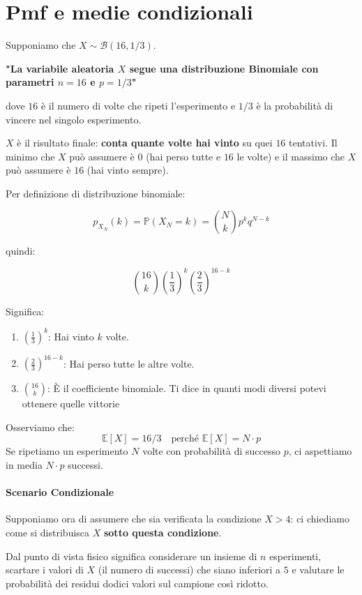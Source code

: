 \section{Pmf e medie condizionali}

Supponiamo che $X \sim \mathcal{B}(16, 1/3)$.

\textbf{"La variabile aleatoria $X$ segue una distribuzione Binomiale con parametri $n= 16$ e $p=1/3$"}

dove $16$ è il numero di volte che ripeti l'esperimento e $1/3$ è la probabilità di vincere nel singolo esperimento.

$X$ è il risultato finale: \textbf{conta quante volte hai vinto} su quei $16$ tentativi. Il minimo che $X$ può assumere è $0$ (hai perso tutte e $16$ le volte) e il massimo che $X$ può assumere è $16$ (hai vinto sempre).

Per definizione di distribuzione binomiale:

\begin{equation}
\boxed{p_{X_N}(k) = \mathbb{P}(X_N = k) = \binom{N}{k} p^k q^{N-k}}
\end{equation}

quindi:

\[
\binom{16}{k} \left(\frac{1}{3}\right)^k \left(\frac{2}{3}\right)^{16-k}
\]

Significa:
\begin{enumerate}
    \item $\left(\frac{1}{3}\right)^k$: Hai vinto $k$ volte.
    \item $\left(\frac{2}{3}\right)^{16-k}$: Hai perso tutte le altre volte.
    \item $\binom{16}{k}$: È il coefficiente binomiale. Ti dice in quanti modi diversi potevi ottenere quelle vittorie 
\end{enumerate}

Osserviamo che:
\[ \mathbb{E}[X] = 16/3 \quad \text{perché } \mathbb{E}[X] = N \cdot p \]
Se ripetiamo un esperimento $N$ volte con probabilità di successo $p$, ci aspettiamo in media $N \cdot p$ successi.

\paragraph{Scenario Condizionale}
Supponiamo ora di assumere che sia verificata la condizione $X > 4$: ci chiediamo come si distribuisca $X$ \textbf{sotto questa condizione}.

Dal punto di vista fisico significa considerare un insieme di $n$ esperimenti, scartare i valori di $X$ (il numero di successi) che siano inferiori a $5$ e valutare le probabilità dei residui dodici valori sul campione così ridotto.

